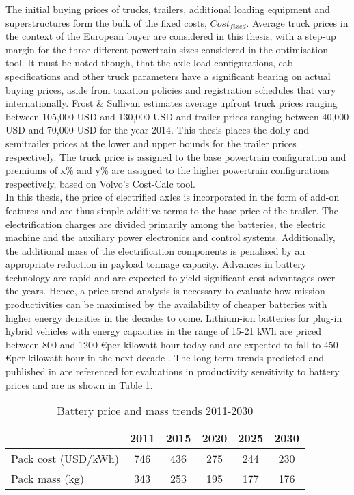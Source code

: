 \documentclass[ExampleMasters.tex]{subfiles}
\begin{document}
		The initial buying prices of trucks, trailers, additional loading equipment and superstructures form the bulk of the fixed costs, $Cost_{fixed}$. Average truck prices in the context of the European buyer are considered in this thesis, with a step-up margin for the three different powertrain sizes considered in the optimisation tool. It must be noted though, that the axle load configurations, cab specifications and other truck parameters have a significant bearing on actual buying prices, aside from taxation policies and registration schedules that vary internationally. Frost \& Sullivan \cite{FrostSullivan} estimates average upfront truck prices ranging between 105,000 USD and 130,000 USD and trailer prices ranging between 40,000 USD and 70,000 USD for the year 2014. This thesis places the dolly and semitrailer prices at the lower and upper bounds for the trailer prices respectively. The truck price is assigned to the base powertrain configuration and premiums of x\% and y\% are assigned to the higher powertrain configurations respectively, based on Volvo's Cost-Calc tool.\\

		In this thesis, the price of electrified axles is incorporated in the form of add-on features and are thus simple additive terms to the base price of the trailer. The electrification charges are divided primarily among the batteries, the electric machine and the auxiliary power electronics and control systems. Additionally, the additional mass of the electrification components is penalised by an appropriate reduction in payload tonnage capacity. Advances in battery technology are rapid and are expected to yield significant cost advantages over the years. Hence, a price trend analysis is necessary to evaluate how mission productivities can be maximised by the availability of cheaper batteries with higher energy densities in the decades to come. Lithium-ion batteries for plug-in hybrid vehicles with energy capacities in the range of 15-21 kWh are priced between 800 and 1200 \euro per kilowatt-hour today \cite{EUROBAT} and are expected to fall to 450 \euro per kilowatt-hour in the next decade \cite{EUROBAT}. The long-term trends predicted and published in \cite[T.~8-16]{ElementEnergy} are referenced for evaluations in productivity sensitivity to battery prices and are as shown in Table \ref{table:batteryPriceMassTrend}.\\

		\begin{table}[ht]
			\centering 
			\begin{tabular}{l c c c c c}
				\cline{2-6}
				\ & 2011 & 2015 & 2020 & 2025 & 2030\\ 
				\hline
			    Pack cost (USD/kWh)  & 746 & 436 & 275 & 244 & 230\\
			    Pack mass (kg)  & 343 & 253 & 195  & 177 & 176\\
				\hline 
			\end{tabular}
			\caption{Battery price and mass trends 2011-2030 \cite{ElementEnergy}} 
			\label{table:batteryPriceMassTrend} 
		\end{table}
\end{document}

